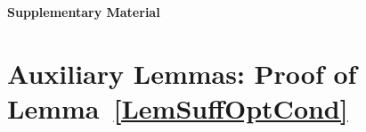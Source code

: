 % 
% 
% 
% 
% 
% 
% 
% 
% 
% 
% 
\noindent
{\Large {\bf Supplementary Material}}


\section{Auxiliary Lemmas: Proof of Lemma~\ref{LemSuffOptCond}}


